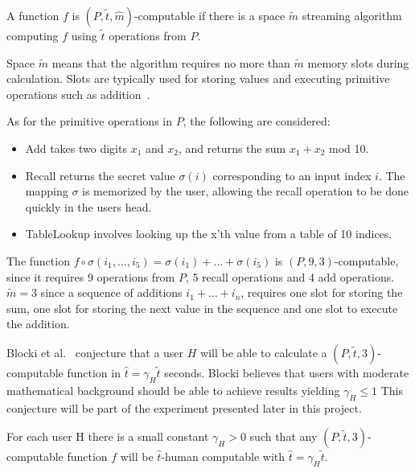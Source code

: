 \begin{definition}
    \label{ptm-computable}
    A function $f$ is $(P, \tilde t, \hat m)$-computable if there is a space $\tilde m$ streaming algorithm computing $f$ using $\tilde t$ operations from $P$.
\end{definition}
\begin{remark}
    Space $\tilde m$ means that the algorithm requires no more than $\tilde m$ memory slots during calculation. Slots are typically used for storing values and executing primitive operations such as addition~\cite{space-complexity}.
\end{remark}



\noindent As for the primitive operations in $P$, the following are considered:
\begin{itemize}
    \item{Add} takes two digits $x_1$ and $x_2$, and returns the sum $x_1 + x_2$ mod 10.
    \item{Recall} returns the secret value $\sigma(i)$ corresponding to an input index $i$. The mapping $\sigma$ is memorized by the user, allowing the recall operation to be done quickly in the users head.
    \item{TableLookup} involves looking up the x'th value from a table of 10 indices.
\end{itemize}

\begin{example}
    The function $f \circ \sigma(i_1,\dots,i_5) = \sigma(i_1) + \dots + \sigma(i_5)$ is $(P,9,3)$-computable, since it requires 9 operations from $P$, 5 recall operations and 4 add operations. $\tilde m=3$ since a sequence of additions $i_1 + \dots + i_n$, requires one slot for storing the sum, one slot for storing the next value in the sequence and one slot to execute the addition.
\end{example}

\par Blocki et al.~\cite{hcp-blocki} conjecture that a user $H$ will be able to calculate a $( P, \tilde t, 3 )$-computable function in $\hat t = \gamma_H \tilde t$ seconds. Blocki believes that users with moderate mathematical background should be able to achieve results yielding $\gamma_H \le 1$  This conjecture will be part of the experiment presented later in this project. 


\begin{conjecture}\label{conjecture1}
    \cite{hcp-blocki} For each user H there is a small constant $\gamma_H > 0$ such that any $(P,\tilde t, 3)$-computable function $f$ will be $\hat t$-human computable with $\hat t = \gamma_H \tilde t$.

\end{conjecture}

